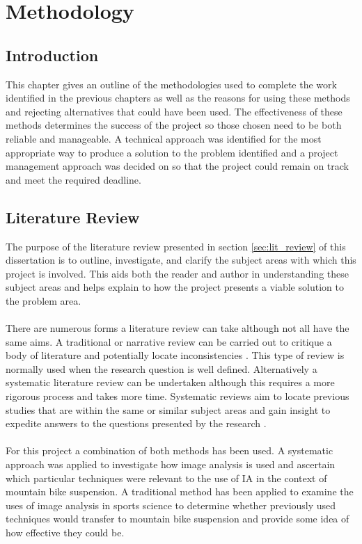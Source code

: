 \section{Methodology}\label{sec:methodology}
	\subsection{Introduction}
		This chapter gives an outline of the methodologies used to complete the work identified in the previous chapters as well as the reasons for using these methods and rejecting alternatives that could have been used. The effectiveness of these methods  determines the success of the project so those chosen need to be both reliable and manageable. A technical approach was identified for the most appropriate way to produce a solution to the problem identified and a project management approach was decided on so that the project could remain on track and meet the required deadline.
	\subsection{Literature Review}
		The purpose of the literature review presented in section \ref{sec:lit_review} of this dissertation is to outline, investigate, and clarify the subject areas with which this project is involved. This aids both the reader and author in understanding these subject areas and helps  explain to how the project presents a viable solution to the problem area.
		\\\\
		There are numerous  forms a literature review can take although not all have the same aims. A traditional or narrative review can be carried out to critique a body of literature and potentially locate inconsistencies \citep{adams2007research}. This type of review is normally used when the research question is well defined. Alternatively a systematic literature review can be undertaken although  this requires a more rigorous process and takes more time. Systematic reviews aim to locate previous studies that are within the same or similar subject areas and gain insight  to expedite answers to the questions presented by the research \citep{kitchenham2009systematic}.
		\\\\
		For this project a combination of both methods  has been used. A systematic approach was applied to investigate  how image analysis is used and ascertain which particular techniques were relevant  to the use of IA in the context of mountain bike suspension. A traditional method has been applied to examine the uses of image analysis in sports science to determine whether  previously used techniques would transfer to mountain bike suspension and provide  some  idea of how effective they could be.
